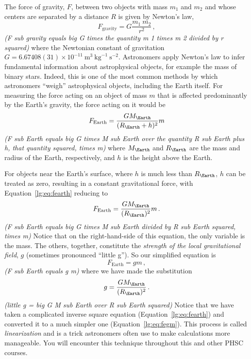 The force of gravity, $F$, between two objects with mass $m_1$ and $m_2$ and whose centers are separated by a distance $R$ is given by Newton's law,
\begin{equation}\label{lg:eq:newtons}
 F_\textrm{gravity} = G \frac{m_1 \: m_2}{r^2} \,,
\end{equation}
\textit{(F sub gravity equals big G times the quantity m 1 times m 2 divided by r squared)}\newline
where the Newtonian constant of gravitation $G = 6.67408(31) \times 10^{-11} \: \textrm{m}^3 \: \textrm{kg}^{-1} \: \textrm{s}^{-2}$. Astronomers apply Newton's law to infer fundamental information about astrophysical objects, for example the mass of binary stars. Indeed, this is one of the most common methods by which astronomers ``weigh'' astrophysical objects, including the Earth itself. For measuring the force acting on an object of mass $m$ that is affected predominantly by the Earth's gravity, the force acting on it would be
\begin{equation}\label{lg:eq:fearth}
 F_\textrm{Earth} = \frac{G M_\Earth}{(R_\Earth + h)^2} m
\end{equation}
\textit{(F sub Earth equals big G times M sub Earth over the quantity R sub Earth plus h, that quantity squared, times m)} \newline
where $M_\Earth$ and $R_\Earth$ are the mass and radius of the Earth, respectively, and $h$ is the height above the Earth.

For objects near the Earth's surface, where $h$ is much less than $R_\Earth$, $h$ can be treated as zero, resulting in a constant gravitational force, with Equation~\ref{lg:eq:fearth} reducing to
\begin{equation}\label{lg:eq:fearthred}
F_\textrm{Earth} = \frac{G M_\Earth}{(R_\Earth)^2} m \,.
\end{equation}
\textit{(F sub Earth equals big G times M sub Earth divided by R sub Earth squared, times m)}\newline
Notice that on the right-hand-side of this equation, the only variable is the mass. The others, together, constitute the \textit{strength of the local gravitational field}, $g$ (sometimes pronounced ``little g''). So our simplified equation is
\begin{equation}\label{lg:eq:fegm}
 F_\textrm{Earth} = g m \,,
\end{equation}
\textit{(F sub Earth equals g m)}\newline
where we have made the substitution
\begin{equation}\label{lg:eq:g}
g = \dfrac{G M_\Earth}{(R_\Earth)^2} \, .
\end{equation}
\textit{(little g = big G M sub Earth over R sub Earth squared)}\newline
Notice that we have taken a complicated inverse square equation (Equation~\ref{lg:eq:fearth}) and
converted it to a much simpler one (Equation~\ref{lg:eq:fegm}). This process is called \textit{linearization} and is a
trick astronomers often use to make calculations more manageable. You will encounter
this technique throughout this and other PHSC courses.

